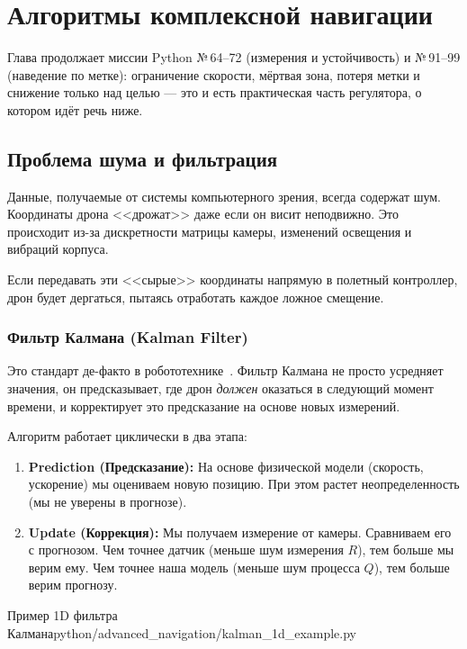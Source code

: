 \section{Алгоритмы комплексной навигации}
\label{sec:python-complex-nav}

\begin{missionbox}
Глава продолжает миссии Python №\,64--72 (измерения и устойчивость) и №\,91--99 (наведение по метке): ограничение скорости, мёртвая зона, потеря метки и снижение только над целью --- это и есть практическая часть регулятора, о котором идёт речь ниже.
\end{missionbox}

\subsection{Проблема шума и фильтрация}
Данные, получаемые от системы компьютерного зрения, всегда содержат шум. Координаты дрона <<дрожат>> даже если он висит неподвижно. Это происходит из-за дискретности матрицы камеры, изменений освещения и вибраций корпуса.

Если передавать эти <<сырые>> координаты напрямую в полетный контроллер, дрон будет дергаться, пытаясь отработать каждое ложное смещение.

\subsubsection{Фильтр Калмана (Kalman Filter)}
Это стандарт де-факто в робототехнике~\cite{kalman1960}. Фильтр Калмана не просто усредняет значения, он предсказывает, где дрон \textit{должен} оказаться в следующий момент времени, и корректирует это предсказание на основе новых измерений.

Алгоритм работает циклически в два этапа:
\begin{enumerate}
    \item \textbf{Prediction (Предсказание):} На основе физической модели (скорость, ускорение) мы оцениваем новую позицию. При этом растет неопределенность (мы не уверены в прогнозе).
    \item \textbf{Update (Коррекция):} Мы получаем измерение от камеры. Сравниваем его с прогнозом. Чем точнее датчик (меньше шум измерения $R$), тем больше мы верим ему. Чем точнее наша модель (меньше шум процесса $Q$), тем больше верим прогнозу.
\end{enumerate}

\begin{codefiletitle}[python]{Пример 1D фильтра Калмана}{python/advanced_navigation/kalman_1d_example.py}
\end{codefiletitle}

